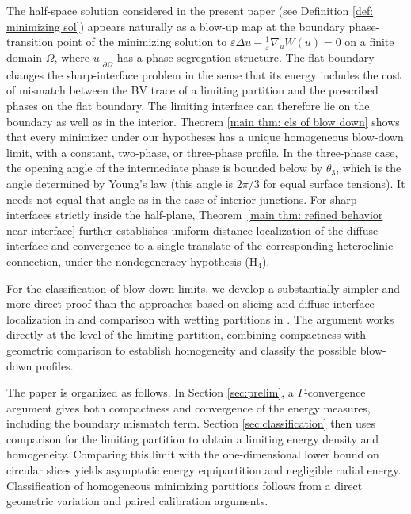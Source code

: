 \documentclass[leqno,11pt]{amsart}
\let\pa=\partial
\let\f=\frac
\let\Om=\Omega
\let\e=\varepsilon
\let\pa=\partial
\theoremstyle{remark}
\begin{document}
The half-space solution considered in the present paper (see Definition \ref{def: minimizing sol}) appears naturally as a blow-up map at the boundary phase-transition point of the minimizing solution to $\e \Delta u-\f{1}{\e}\nabla_u W(u)=0$ on a finite domain $\Omega$, where $u|_{\pa\Om}$ has a phase segregation structure. The flat boundary changes the sharp-interface problem in the sense that its energy includes the cost of mismatch between the BV trace of a limiting partition and the prescribed phases on the flat boundary. The limiting interface can therefore lie on the boundary as well as in the interior. Theorem \ref{main thm: cls of blow down} shows that every minimizer under our hypotheses has a unique homogeneous blow-down limit, with a constant, two-phase, or three-phase profile. In the three-phase case, the opening angle of the intermediate phase is bounded below by $\theta_3$, which is the angle determined by Young's law (this angle is $2\pi/3$ for equal surface tensions). It needs not equal that angle as in the case of interior junctions. For sharp interfaces strictly inside the half-plane, Theorem~\ref{main thm: refined behavior near interface} further establishes uniform distance localization of the diffuse interface and convergence to a single translate of the corresponding heteroclinic connection, under the nondegeneracy hypothesis ($\mathrm{H}_4$).

For the classification of blow-down limits, we develop a substantially simpler and more direct proof than the approaches based on slicing and diffuse-interface localization in \cite{alikakos2024triple,geng2025uniqueness} and comparison with wetting partitions in \cite{ss2024}. The argument works directly at the level of the limiting partition, combining compactness with geometric comparison to establish homogeneity and classify the possible blow-down profiles.

The paper is organized as follows. In Section \ref{sec:prelim},  a $\Gamma$-convergence argument gives both compactness and convergence of the energy measures, including the boundary mismatch term. Section \ref{sec:classification} then uses comparison for the limiting partition to obtain a limiting energy density and homogeneity. Comparing this limit with the one-dimensional lower bound on circular slices yields asymptotic energy equipartition and negligible radial energy. Classification of homogeneous minimizing partitions follows from a direct geometric variation and paired calibration arguments. 
\end{document}
